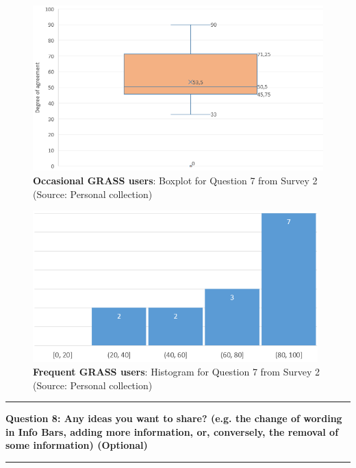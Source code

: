 \documentclass[a4paper,10pt,twoside]{article}
\begin{document}
\newpage
\begin{figure}[hbt!] 
\begin{center}
\includegraphics[width=12cm]{../surveys/analyzed_data/survey2_question7_boxplot_group1.png} 
\caption[\textbf{Occasional GRASS users}: Boxplot for Question 7 from Survey 2]{\textbf{Occasional GRASS users}: Boxplot for Question 7 from Survey 2 (Source: Personal collection)}
\label{fig:survey2_question7_boxplot_group1}
\end{center}
\end{figure}

\vspace{0.3cm}
\begin{figure}[hbt!] 
\begin{center}
\includegraphics[width=11cm]{../surveys/analyzed_data/survey2_question7_histogram_group2.png} 
\caption[\textbf{Frequent GRASS users}: Histogram for Question 7 from Survey 2]{\textbf{Frequent GRASS users}: Histogram for Question 7 from Survey 2 (Source: Personal collection)}
\label{fig:survey2_question7_histogram_group2}
\end{center}
\end{figure}

\par\noindent\rule{\textwidth}{0.4pt}
\noindent \textbf{Question 8: Any ideas you want to share? (e.g. the change of wording in Info Bars, adding more information, or, conversely, the removal of some information) (Optional)}
\par\noindent\rule{\textwidth}{0.4pt}
\end{document}

